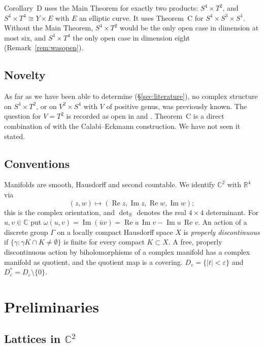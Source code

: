 \documentclass{article}
\theoremstyle{definition}
\theoremstyle{plain}
\newcommand{\R}{\mathbb{R}}
\newcommand{\C}{\mathbb{C}}
\DeclareMathOperator{\Ima}{Im}
\DeclareMathOperator{\Rea}{Re}
\begin{document}
Corollary~D uses the Main Theorem for exactly two products: $S^4\times T^2$, and
$S^4\times T^4\cong Y\times E$ with $E$ an elliptic curve. It uses Theorem~C for
$S^4\times S^3\times S^1$. Without the Main Theorem, $S^4\times T^2$ would be the only open
case in dimension at most six, and $S^4\times T^4$ the only open case in dimension eight
(Remark~\ref{rem:wasopen}).

\subsection{Novelty}\label{sec:novelty}
As far as we have been able to determine (\S\ref{sec:literature}), no complex structure
on $S^4\times T^2$, or on $V^2\times S^4$ with $V$ of positive genus, was previously
known. The question for $V=T^2$ is recorded as open in \cite{Calabi58} and
\cite{MO89798}. Theorem~C is a direct combination of \cite{LLZ26} with the
Calabi--Eckmann construction. We have not seen it stated.

\subsection*{Conventions}
Manifolds are smooth, Hausdorff and second countable. We identify $\C^2$ with $\R^4$
via
\[(z,w)\mapsto(\Rea z,\Ima z,\Rea w,\Ima w);\]
this is the complex orientation, and $\det_\R$ denotes the real $4\times4$ determinant. For $u,v\in\C$ put
$\omega(u,v)=\Ima(\bar u v)=\Rea u\,\Ima v-\Ima u\,\Rea v$. An action of a discrete
group $\Gamma$ on a locally compact Hausdorff space $X$ is \emph{properly discontinuous}
if $\{\gamma:\gamma K\cap K\neq\emptyset\}$ is finite for every compact $K\subset X$. A free,
properly discontinuous action by biholomorphisms of a complex manifold has a complex
manifold as quotient, and the quotient map is a covering. $D_\varepsilon=\{|t|<\varepsilon\}$ and
$D^*_\varepsilon=D_\varepsilon\setminus\{0\}$.

\section{Preliminaries}

\subsection{Lattices in $\C^2$}
\end{document}
